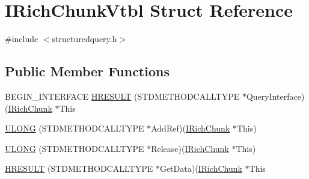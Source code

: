 \hypertarget{struct_i_rich_chunk_vtbl}{}\section{I\+Rich\+Chunk\+Vtbl Struct Reference}
\label{struct_i_rich_chunk_vtbl}


{\ttfamily \#include $<$structuredquery.\+h$>$}

\subsection*{Public Member Functions}
\begin{DoxyCompactItemize}
\item 
B\+E\+G\+I\+N\+\_\+\+I\+N\+T\+E\+R\+F\+A\+CE \hyperlink{struct_i_rich_chunk_vtbl_a81164c5f78c8a0cee7ed2e00eff2cbec}{H\+R\+E\+S\+U\+LT} (S\+T\+D\+M\+E\+T\+H\+O\+D\+C\+A\+L\+L\+T\+Y\+PE $\ast$Query\+Interface)(\hyperlink{structuredquery_8h_a155fe105ebaf3c6b04f856696b0e2596}{I\+Rich\+Chunk} $\ast$This
\item 
\hyperlink{struct_i_rich_chunk_vtbl_ae509434e2b25f5b32ce7e0ac642b286a}{U\+L\+O\+NG} (S\+T\+D\+M\+E\+T\+H\+O\+D\+C\+A\+L\+L\+T\+Y\+PE $\ast$Add\+Ref)(\hyperlink{structuredquery_8h_a155fe105ebaf3c6b04f856696b0e2596}{I\+Rich\+Chunk} $\ast$This)
\item 
\hyperlink{struct_i_rich_chunk_vtbl_a421e93fa3197defffe7e9de7d4fc972a}{U\+L\+O\+NG} (S\+T\+D\+M\+E\+T\+H\+O\+D\+C\+A\+L\+L\+T\+Y\+PE $\ast$Release)(\hyperlink{structuredquery_8h_a155fe105ebaf3c6b04f856696b0e2596}{I\+Rich\+Chunk} $\ast$This)
\item 
\hyperlink{struct_i_rich_chunk_vtbl_af1d06d0b7ff821a6d8bcd8837aad6158}{H\+R\+E\+S\+U\+LT} (S\+T\+D\+M\+E\+T\+H\+O\+D\+C\+A\+L\+L\+T\+Y\+PE $\ast$Get\+Data)(\hyperlink{structuredquery_8h_a155fe105ebaf3c6b04f856696b0e2596}{I\+Rich\+Chunk} $\ast$This
\end{DoxyCompactItemize}
